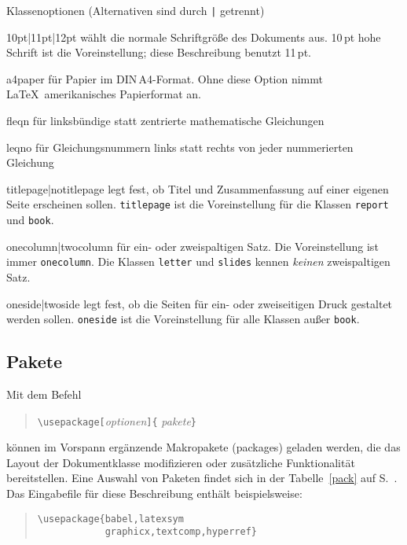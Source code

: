 \begin{table}[hbpt]
\caption[Klassenoptionen]{Klassenoptionen (Alternativen sind durch \texttt{|}
  getrennt)} \label{options}
\begin{lminipage}{11cm}
\begin{ttdescription}%
\item [10pt|11pt|12pt] wählt die normale Schriftgröße des Dokuments aus.
  10\,pt hohe Schrift ist die Voreinstellung; diese Beschreibung benutzt 11\,pt.

\item[a4paper] für Papier im DIN\,A4-Format. Ohne diese
  Option nimmt \LaTeX\ amerikanisches Papierformat an.
 
\item [fleqn] für linksbündige statt zentrierte mathematische
  Gleichungen
 
\item [leqno] für Gleichungsnummern links statt rechts von jeder
  nummerierten Gleichung
 
\item [titlepage|notitlepage] legt fest, ob Titel und Zusammenfassung
  auf einer eigenen Seite erscheinen sollen.  \texttt{titlepage} ist
  die Voreinstellung für die Klassen \texttt{report} und \texttt{book}.
 
\item [onecolumn|twocolumn] für ein- oder zweispaltigen Satz.
 Die Voreinstellung ist immer \texttt{onecolumn}.  
 Die Klassen \texttt{letter} und \texttt{slides} kennen \emph{keinen}
 zweispaltigen Satz.
 
\item [oneside|twoside] legt fest, ob die Seiten für ein- oder
  zweiseitigen  Druck gestaltet werden sollen.  
  \texttt{oneside} ist die Voreinstellung für
  alle Klassen außer \texttt{book}.
  
\end{ttdescription}
\end{lminipage}
\end{table}



\subsection{Pakete}\label{packages}
 
Mit dem Befehl
\begin{verse}
\verb:\usepackage[:\textit{optionen}\verb:]{:%
  \textit{pakete}\verb:}:
\end{verse}
können im Vorspann ergänzende Makropakete (packages) geladen werden,
die das Layout der Dokumentklasse
modifizieren oder zusätzliche Funktionalität bereitstellen.
Eine Auswahl von Paketen findet sich in der Tabelle~\ref{pack} 
auf S.~\pageref{pack}.
Das Eingabefile für diese Beschreibung enthält beispielsweise:
\begin{verse}
\verb|\usepackage{babel,latexsym|\\
\verb|            graphicx,textcomp,hyperref}|
\end{verse}


